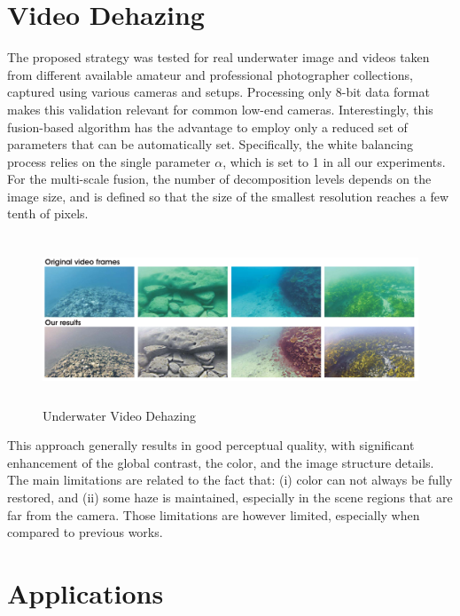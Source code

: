 \documentclass[hidelinks, 12pt]{report}
\begin{document}
\section{Video Dehazing}
The proposed strategy was tested for real underwater image and videos taken from different available amateur and professional photographer collections, captured using various cameras and setups. Processing only 8-bit data format makes this validation relevant for common
low-end cameras. Interestingly, this fusion-based algorithm has the advantage to employ only a reduced set of parameters that can be automatically set. Specifically, the white balancing process relies on the single parameter $\alpha$, which is set to 1 in all our experiments. For the multi-scale fusion, the number of decomposition levels depends on the image size, and is defined so that the size of the smallest resolution reaches a few tenth of pixels.
\begin{figure}[H]
\centering
\includegraphics[width=15cm,height=5cm]{Video.png}
\caption[Underwater Video Dehazing]{Underwater Video Dehazing}
\label{Underwater Video Dehazing}
\end{figure}
This approach generally results in good perceptual quality, with significant enhancement of the global contrast, the color, and the image structure details. The main limitations are related to the fact that: (i) color can not always be fully restored, and (ii) some haze is maintained, especially in the scene regions that are far from the camera. Those limitations are however limited, especially when compared to previous works.
\section{Applications}
\end{document}
